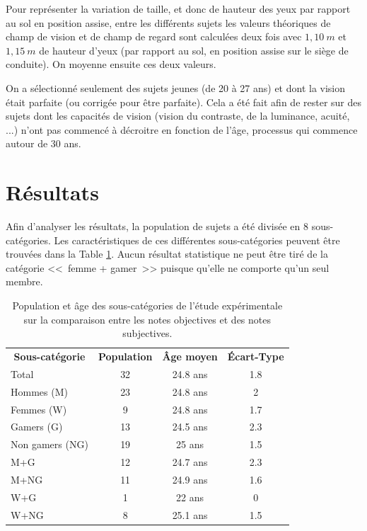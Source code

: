 	\par Pour représenter la variation de taille, et donc de hauteur des yeux par rapport au sol en position assise, entre les différents sujets les valeurs théoriques de champ de vision et de champ de regard sont calculées deux fois avec $1,10~m$ et $1,15~m$ de hauteur d'yeux (par rapport au sol, en position assise sur le siège de conduite). On moyenne ensuite ces deux valeurs.
	
	\par On a sélectionné seulement des sujets jeunes (de 20 à 27 ans) et dont la vision était parfaite (ou corrigée pour être parfaite). Cela a été fait afin de rester sur des sujets dont les capacités de vision (vision du contraste, de la luminance, acuité, ...) n'ont pas commencé à décroitre en fonction de l'âge, processus qui commence autour de 30 ans.
	
	\section{Résultats}
	\par Afin d'analyser les résultats, la population de sujets a été divisée en 8 sous-catégories. Les caractéristiques de ces différentes sous-catégories peuvent être trouvées dans la Table \ref{tab:subpopulations}. Aucun résultat statistique ne peut être tiré de la catégorie <<~femme + gamer~>> puisque qu'elle ne comporte qu'un seul membre.
	
	\begin{table}[h]
		\centering
		\caption{Population et âge des sous-catégories de l'étude expérimentale sur la comparaison entre les notes objectives et des notes subjectives.}
		\label{tab:subpopulations}
		\small
		\begin{tabular}{lccc}
			\multicolumn{1}{c}{\bfseries Sous-catégorie} & \multicolumn{1}{c}{\bfseries Population} & \multicolumn{1}{c}{\bfseries Âge moyen} & \multicolumn{1}{c}{\bfseries Écart-Type}\\
			Total & 32 & 24.8 ans & 1.8\\			
			Hommes (M) & 23 & 24.8 ans & 2\\
			Femmes (W) & 9 & 24.8 ans & 1.7\\
			Gamers (G) & 13 & 24.5 ans & 2.3\\
			Non gamers (NG) & 19 & 25 ans & 1.5\\
			M+G & 12 & 24.7 ans & 2.3\\
			M+NG & 11 & 24.9 ans & 1.6\\
			W+G & 1 & 22 ans & 0\\
			W+NG & 8 & 25.1 ans & 1.5\\
		\end{tabular}
	\end{table}
	
